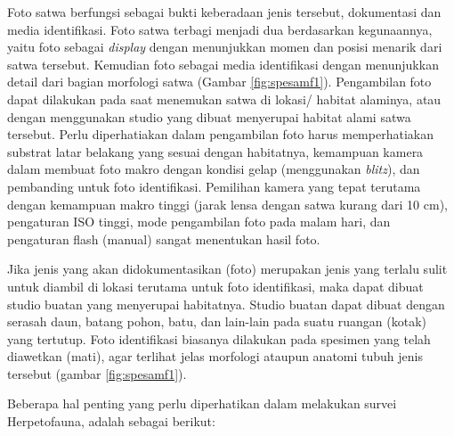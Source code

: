 \documentclass[
]{book}
\begin{document}
Foto satwa berfungsi sebagai bukti keberadaan jenis tersebut, dokumentasi dan media identifikasi. Foto satwa terbagi menjadi dua berdasarkan kegunaannya, yaitu foto sebagai \emph{display} dengan menunjukkan momen dan posisi menarik dari satwa tersebut. Kemudian foto sebagai media identifikasi dengan menunjukkan detail dari bagian morfologi satwa (Gambar \ref{fig:spesamf1}). Pengambilan foto dapat dilakukan pada saat menemukan satwa di lokasi/ habitat alaminya, atau dengan menggunakan studio yang dibuat menyerupai habitat alami satwa tersebut. Perlu diperhatiakan dalam pengambilan foto harus memperhatiakan substrat latar belakang yang sesuai dengan habitatnya, kemampuan kamera dalam membuat foto makro dengan kondisi gelap (menggunakan \emph{blitz}), dan pembanding untuk foto identifikasi. Pemilihan kamera yang tepat terutama dengan kemampuan makro tinggi (jarak lensa dengan satwa kurang dari 10 cm), pengaturan ISO tinggi, mode pengambilan foto pada malam hari, dan pengaturan flash (manual) sangat menentukan hasil foto.

Jika jenis yang akan didokumentasikan (foto) merupakan jenis yang terlalu sulit untuk diambil di lokasi terutama untuk foto identifikasi, maka dapat dibuat studio buatan yang menyerupai habitatnya. Studio buatan dapat dibuat dengan serasah daun, batang pohon, batu, dan lain-lain pada suatu ruangan (kotak) yang tertutup. Foto identifikasi biasanya dilakukan pada spesimen yang telah diawetkan (mati), agar terlihat jelas morfologi ataupun anatomi tubuh jenis tersebut (gambar \ref{fig:spesamf1}).

Beberapa hal penting yang perlu diperhatikan dalam melakukan survei Herpetofauna, adalah sebagai berikut:
\end{document}
